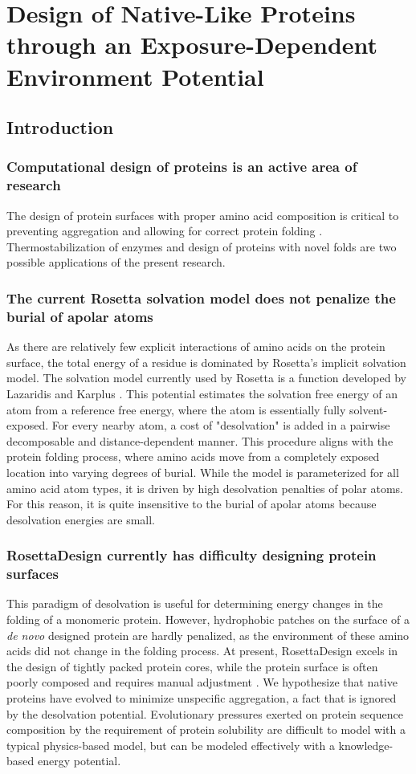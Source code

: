\chapter{Design of Native-Like Proteins through an Exposure-Dependent Environment Potential}
\label{chap:nv_kbp}
\section{Introduction}
\subsection{Computational design of proteins is an active area of research}
The design of protein surfaces with proper amino acid composition is critical to preventing aggregation and allowing for correct protein folding \citep{Chandler:2005ds}.
Thermostabilization of enzymes and design of proteins with novel folds are two possible applications of the present research. 

\subsection{The current Rosetta solvation model does not penalize the burial of apolar atoms}
As there are relatively few explicit interactions of amino acids on the protein surface, the total energy of a residue is dominated by Rosetta's implicit solvation model.
The solvation model currently used by Rosetta is a function developed by Lazaridis and Karplus \citep{Lazaridis:1999wi}.
This potential estimates the solvation free energy of an atom from a reference free energy, where the atom is essentially fully solvent-exposed.
For every nearby atom, a cost of "desolvation" is added in a pairwise decomposable and distance-dependent manner.
This procedure aligns with the protein folding process, where amino acids move from a completely exposed location into varying degrees of burial.
While the model is parameterized for all amino acid atom types, it is driven by high desolvation penalties of polar atoms.
For this reason, it is quite insensitive to the burial of apolar atoms because desolvation energies are small. 

\subsection{RosettaDesign currently has difficulty designing protein surfaces}
This paradigm of desolvation is useful for determining energy changes in the folding of a monomeric protein.
However, hydrophobic patches on the surface of a \textit{de novo} designed protein are hardly penalized, as the environment of these amino acids did not change in the folding process.
At present, RosettaDesign excels in the design of tightly packed protein cores, while the protein surface is often poorly composed and requires manual adjustment \citep{Dantas:2003vt}.
We hypothesize that native proteins have evolved to minimize unspecific aggregation, a fact that is ignored by the desolvation potential.
Evolutionary pressures exerted on protein sequence composition by the requirement of protein solubility are difficult to model with a typical physics-based model, but can be modeled effectively with a knowledge-based energy potential. 

